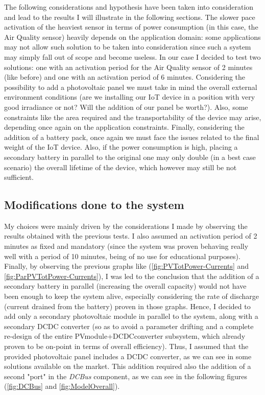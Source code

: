 \documentclass[a4paper]{article}
\begin{document}
    The following considerations and hypothesis have been taken into consideration and lead to the results I will illustrate in the following sections.
    The slower pace activation of the heaviest sensor in terms of power consumption (in this case, the Air Quality sensor) heavily depends on the application domain: some applications may not allow such solution to be taken into consideration since such a system may simply fall out of scope and become useless. In our case I decided to test two solutions: one with an activation period for the Air Quality sensor of 2 minutes (like before) and one with an activation period of 6 minutes.
    Considering the possibility to add a photovoltaic panel we must take in mind the overall external environment conditions (are we installing our IoT device in a position with very good irradiance or not? Will the addition of our panel be worth?). Also, some constraints like the area required and the transportability of the device may arise, depending once again on the application constraints.
    Finally, considering the addition of a battery pack, once again we must face the issues related to the final weight of the IoT device. Also, if the power consumption is high, placing a secondary battery in parallel to the original one may only double (in a best case scenario) the overall lifetime of the device, which however may still be not sufficient.

    \subsection{Modifications done to the system}
        My choices were mainly driven by the considerations I made by observing the results obtained with the previous tests. I also assumed an activation period of 2 minutes as fixed and mandatory (since the system was proven behaving really well with a period of 10 minutes, being of no use for educational purposes). Finally, by observing the previous graphs like (\ref{fig:PVTotPower-Currents} and \ref{fig:ParPVTotPower-Currents}), I was led to the conclusion that the addition of a secondary battery in parallel (increasing the overall capacity) would not have been enough to keep the system alive, especially considering the rate of discharge (current drained from the battery) proven in those graphs.
        Hence, I decided to add only a secondary photovoltaic module in parallel to the system, along with a secondary DCDC converter (so as to avoid a parameter drifting and a complete re-design of the entire PVmodule+DCDCconverter subsystem, which already proven to be on-point in terms of overall efficiency). 
        Thus, I assumed that the provided photovoltaic panel includes a DCDC converter, as we can see in some solutions available on the market.
        This addition required also the addition of a second "port" in the \emph{DCBus} component, as we can see in the following figures (\ref{fig:DCBus} and \ref{fig:ModelOverall}).
\end{document}
